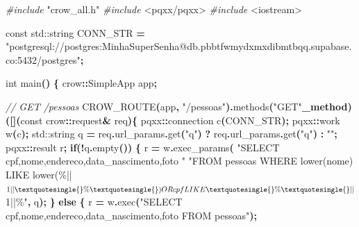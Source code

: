 \documentclass[
]{book}
\newenvironment{Shaded}{\begin{snugshade}}{\end{snugshade}}
\newcommand{\AttributeTok}[1]{\textcolor[rgb]{0.13,0.29,0.53}{#1}}
\newcommand{\BuiltInTok}[1]{#1}
\newcommand{\CommentTok}[1]{\textcolor[rgb]{0.56,0.35,0.01}{\textit{#1}}}
\newcommand{\ControlFlowTok}[1]{\textcolor[rgb]{0.13,0.29,0.53}{\textbf{#1}}}
\newcommand{\DataTypeTok}[1]{\textcolor[rgb]{0.13,0.29,0.53}{#1}}
\newcommand{\ImportTok}[1]{#1}
\newcommand{\NormalTok}[1]{#1}
\newcommand{\OperatorTok}[1]{\textcolor[rgb]{0.81,0.36,0.00}{\textbf{#1}}}
\newcommand{\PreprocessorTok}[1]{\textcolor[rgb]{0.56,0.35,0.01}{\textit{#1}}}
\newcommand{\StringTok}[1]{\textcolor[rgb]{0.31,0.60,0.02}{#1}}
\begin{document}
\begin{Shaded}
\begin{Highlighting}[]
\PreprocessorTok{\#include }\ImportTok{"crow\_all.h"}
\PreprocessorTok{\#include }\ImportTok{\textless{}pqxx/pqxx\textgreater{}}
\PreprocessorTok{\#include }\ImportTok{\textless{}iostream\textgreater{}}

\AttributeTok{const} \BuiltInTok{std::}\NormalTok{string CONN\_STR }\OperatorTok{=}
    \StringTok{"postgresql://postgres:MinhaSuperSenha@db.pbbtfwmydxmxdibmtbqq.supabase.co:5432/postgres"}\OperatorTok{;}

\DataTypeTok{int}\NormalTok{ main}\OperatorTok{()} \OperatorTok{\{}
\NormalTok{    crow}\OperatorTok{::}\NormalTok{SimpleApp app}\OperatorTok{;}

    \CommentTok{// GET /pessoas}
\NormalTok{    CROW\_ROUTE}\OperatorTok{(}\NormalTok{app}\OperatorTok{,} \StringTok{"/pessoas"}\OperatorTok{).}\NormalTok{methods}\OperatorTok{(}\StringTok{"GET"}\OperatorTok{\_method)}
    \OperatorTok{([](}\AttributeTok{const}\NormalTok{ crow}\OperatorTok{::}\NormalTok{request}\OperatorTok{\&}\NormalTok{ req}\OperatorTok{)\{}
\NormalTok{        pqxx}\OperatorTok{::}\NormalTok{connection c}\OperatorTok{(}\NormalTok{CONN\_STR}\OperatorTok{);}
\NormalTok{        pqxx}\OperatorTok{::}\NormalTok{work w}\OperatorTok{(}\NormalTok{c}\OperatorTok{);}
        \BuiltInTok{std::}\NormalTok{string q }\OperatorTok{=}\NormalTok{ req}\OperatorTok{.}\NormalTok{url\_params}\OperatorTok{.}\NormalTok{get}\OperatorTok{(}\StringTok{"q"}\OperatorTok{)} \OperatorTok{?}\NormalTok{ req}\OperatorTok{.}\NormalTok{url\_params}\OperatorTok{.}\NormalTok{get}\OperatorTok{(}\StringTok{"q"}\OperatorTok{)} \OperatorTok{:} \StringTok{""}\OperatorTok{;}
\NormalTok{        pqxx}\OperatorTok{::}\NormalTok{result r}\OperatorTok{;}
        \ControlFlowTok{if}\OperatorTok{(!}\NormalTok{q}\OperatorTok{.}\NormalTok{empty}\OperatorTok{())} \OperatorTok{\{}
\NormalTok{            r }\OperatorTok{=}\NormalTok{ w}\OperatorTok{.}\NormalTok{exec\_params}\OperatorTok{(}
                \StringTok{"SELECT cpf,nome,endereco,data\_nascimento,foto "}
                \StringTok{"FROM pessoas WHERE lower(nome) LIKE lower(\textquotesingle{}\%\textquotesingle{}||$1||\textquotesingle{}\%\textquotesingle{}) OR cpf LIKE \textquotesingle{}\%\textquotesingle{}||$1||\textquotesingle{}\%\textquotesingle{}"}\OperatorTok{,}
\NormalTok{                q}\OperatorTok{);}
        \OperatorTok{\}} \ControlFlowTok{else} \OperatorTok{\{}
\NormalTok{            r }\OperatorTok{=}\NormalTok{ w}\OperatorTok{.}\NormalTok{exec}\OperatorTok{(}\StringTok{"SELECT cpf,nome,endereco,data\_nascimento,foto FROM pessoas"}\OperatorTok{);}

\end{Highlighting}
\end{Shaded}
\end{document}
